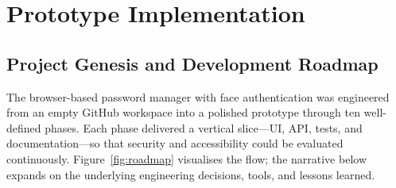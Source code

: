 
\chapter{Prototype Implementation}%
\label{ch:implementatie}



\section{Project Genesis and Development Roadmap}
The browser-based password manager with face authentication was engineered
from an empty GitHub workspace into a polished prototype through ten
well-defined phases.  Each phase delivered a vertical slice—UI, API, tests,
and documentation—so that security and accessibility could be evaluated
continuously.  Figure~\ref{fig:roadmap} visualises the flow; the narrative
below expands on the underlying engineering decisions, tools, and lessons
learned.

